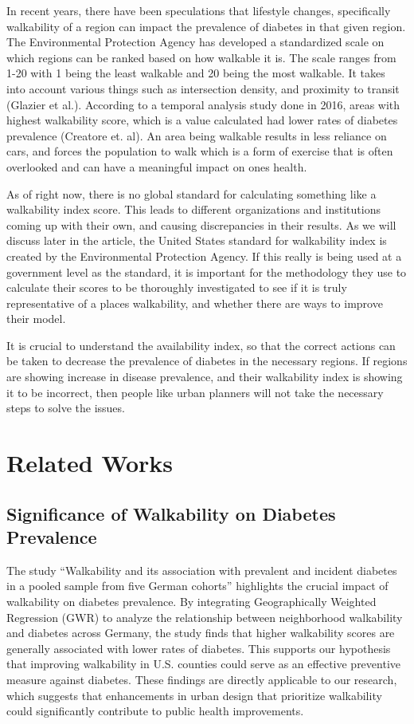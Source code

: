 \documentclass[
]{article}
\begin{document}
In recent years, there have been speculations that lifestyle changes,
specifically walkability of a region can impact the prevalence of
diabetes in that given region. The Environmental Protection Agency has
developed a standardized scale on which regions can be ranked based on
how walkable it is. The scale ranges from 1-20 with 1 being the least
walkable and 20 being the most walkable. It takes into account various
things such as intersection density, and proximity to transit (Glazier
et al.). According to a temporal analysis study done in 2016, areas with
highest walkability score, which is a value calculated had lower rates
of diabetes prevalence (Creatore et. al). An area being walkable results
in less reliance on cars, and forces the population to walk which is a
form of exercise that is often overlooked and can have a meaningful
impact on ones health.

As of right now, there is no global standard for calculating something
like a walkability index score. This leads to different organizations
and institutions coming up with their own, and causing discrepancies in
their results. As we will discuss later in the article, the United
States standard for walkability index is created by the Environmental
Protection Agency. If this really is being used at a government level as
the standard, it is important for the methodology they use to calculate
their scores to be thoroughly investigated to see if it is truly
representative of a places walkability, and whether there are ways to
improve their model.

It is crucial to understand the availability index, so that the correct
actions can be taken to decrease the prevalence of diabetes in the
necessary regions. If regions are showing increase in disease
prevalence, and their walkability index is showing it to be incorrect,
then people like urban planners will not take the necessary steps to
solve the issues.

\section{Related Works}\label{related-works}

\subsection{Significance of Walkability on Diabetes
Prevalence}\label{significance-of-walkability-on-diabetes-prevalence}

The study ``Walkability and its association with prevalent and incident
diabetes in a pooled sample from five German cohorts'' highlights the
crucial impact of walkability on diabetes prevalence. By integrating
Geographically Weighted Regression (GWR) to analyze the relationship
between neighborhood walkability and diabetes across Germany, the study
finds that higher walkability scores are generally associated with lower
rates of diabetes. This supports our hypothesis that improving
walkability in U.S. counties could serve as an effective preventive
measure against diabetes. These findings are directly applicable to our
research, which suggests that enhancements in urban design that
prioritize walkability could significantly contribute to public health
improvements.
\end{document}
